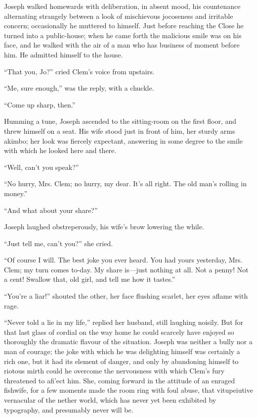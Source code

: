 Joseph walked homewards with deliberation, in absent mood, his
countenance alternating strangely between a look of mischievous
{}jocoseness and irritable concern; occasionally he muttered to himself.
Just before reaching the Close he turned into a public-house; when he
came forth the malicious smile was on his face, and he walked with the
air of a man who has business of moment before him. He admitted himself
to the house.

``That you, Jo?'' cried Clem's voice from upstairs.

``Me, sure enough,'' was the reply, with a chuckle.

``Come up sharp, then.''

Humming a tune, Joseph ascended to the sitting-room on the first floor,
and threw himself on a seat. His wife stood just in front of him, her
sturdy arms akimbo; her look was fiercely expectant, answering in some
degree to the smile with which he looked here and there.

``Well, can't you speak?''

``No hurry, Mrs. Clem; no hurry, my dear. It's all right. The old man's
rolling in money.''

``And what about your share?''

{}Joseph laughed obstreperously, his wife's brow lowering the while.

``Just tell me, can't you?'' she cried.

``Of course I will. The best joke you ever heard. You had yours
yesterday, Mrs. Clem; my turn comes to-day. My share is---just nothing
at all. Not a penny! Not a cent! Swallow that, old girl, and tell me how
it tastes.''

``You're a liar!'' shouted the other, her face flushing scarlet, her
eyes aflame with rage.

``Never told a lie in my life,'' replied her husband, still laughing
noisily. But for that last glass of cordial on the way home he could
scarcely have enjoyed so thoroughly the dramatic flavour of the
situation. Joseph was neither a bully nor a man of courage; the joke
with which he was delighting himself was certainly a rich one, but it
had its element of danger, and only by abandoning himself to riotous
mirth could he overcome the nervousness with which Clem's fury
threatened to afi'ect him. She, coming forward in the {}attitude of an
enraged fishwife, for a few moments made the room ring with foul abuse,
that vitupeiutive vernacular of the nether world, which has never yet
been exhibited by typography, and presumably never will be.

